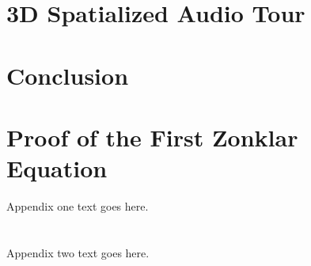 \documentclass[a4paper, 10pt, american, titlepage]{article}
\begin{document}
\section{3D Spatialized Audio Tour}
\label{sec:3dSpatializedAudioTour}

\newpage

\section{Conclusion}
\label{sec:conclusion}

\clearpage %

\printbibliography
{}

\newpage

\appendices
\section{Proof of the First Zonklar Equation}
Appendix one text goes here.

\section{}
Appendix two text goes here.
\end{document}
